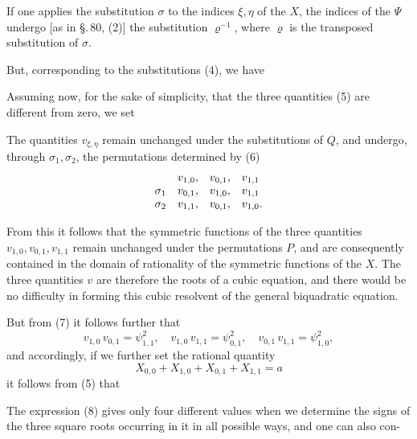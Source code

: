 If one applies the substitution $\sigma$ to the indices $\xi, \eta$ of the $X$,
the indices of the $\Psi$ undergo [as in \S.\,80, (2)] the substitution
$\varrho^{-1}$, where $\varrho$ is the transposed substitution of $\sigma$.

But, corresponding to the substitutions (4), we have

Assuming now, for the sake of simplicity, that the three quantities (5) are
different from zero, we set

The quantities $v_{\xi,\eta}$ remain unchanged under the substitutions of $Q$,
and undergo, through $\sigma_1, \sigma_2$, the permutations determined by (6)
\[
\begin{array}{l l l l}
 & v_{1,0}, & v_{0,1}, & v_{1,1}\\
\sigma_1 & v_{0,1}, & v_{1,0}, & v_{1,1}\\
\sigma_2 & v_{1,1}, & v_{0,1}, & v_{1,0}.
\end{array}
\]

From this it follows that the symmetric functions of the three quantities
$v_{1,0}, v_{0,1}, v_{1,1}$ remain unchanged under the permutations $P$, and
are consequently contained in the domain of rationality of the symmetric
functions of the $X$. The three quantities $v$ are therefore the roots of a
cubic equation, and there would be no difficulty in forming this cubic
resolvent of the general biquadratic equation.

But from (7) it follows further that
\[
v_{1,0}\,v_{0,1} = \psi_{1,1}^2, \quad v_{1,0}\,v_{1,1} = \psi_{0,1}^2,
\quad v_{0,1}\,v_{1,1} = \psi_{1,0}^2, %
\]
and accordingly, if we further set the rational quantity
\[
X_{0,0} + X_{1,0} + X_{0,1} + X_{1,1} = a
\]
it follows from (5) that

The expression (8) gives only four different values when we determine the
signs of the three square roots occurring in it in all possible ways, and one
can also con-
